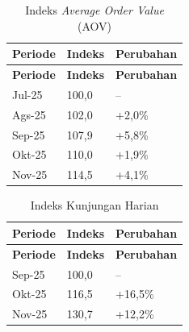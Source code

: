 \begingroup
\begin{xltabular}{\textwidth}{|Y|C{4.0cm}|C{4.0cm}|}
\caption{Indeks \textit{Average Order Value} (AOV)}
\label{tab:indeks_aov_grabfood} \\
        \toprule
        \textbf{Periode} & \textbf{Indeks} & \textbf{Perubahan} \\ \hline
        \midrule
\endfirsthead
{}
        \toprule
        \textbf{Periode} & \textbf{Indeks} & \textbf{Perubahan} \\ \hline
        \midrule
\endhead
{}
\endfoot
        \bottomrule
        \endlastfoot
        Jul-25           & 100,0           & --                 \\ \hline
        Ags-25           & 102,0           & +2,0\%             \\ \hline
        Sep-25           & 107,9           & +5,8\%             \\ \hline
        Okt-25           & 110,0           & +1,9\%             \\ \hline
        Nov-25           & 114,5           & +4,1\%             \\ \hline
        \bottomrule
    
\end{xltabular}
\endgroup

\begingroup
\begin{xltabular}{\textwidth}{|Y|C{4.0cm}|C{4.0cm}|}
\caption{Indeks Kunjungan Harian}
\label{tab:indeks_kunjungan_grabfood} \\
        \toprule
        \textbf{Periode} & \textbf{Indeks} & \textbf{Perubahan} \\ \hline
        \midrule
\endfirsthead
{}
        \toprule
        \textbf{Periode} & \textbf{Indeks} & \textbf{Perubahan} \\ \hline
        \midrule
\endhead
{}
\endfoot
        \bottomrule
        \endlastfoot
        Sep-25           & 100,0           & --                 \\ \hline
        Okt-25           & 116,5           & +16,5\%            \\ \hline
        Nov-25           & 130,7           & +12,2\%            \\ \hline
        \bottomrule
    
\end{xltabular}
\endgroup

